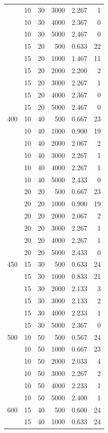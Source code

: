 \begin{longtable}{rrrrrr}
 & 10 & 30 & 3000 & 2.267 & 1 \\
 & 10 & 30 & 4000 & 2.367 & 0 \\
 & 10 & 30 & 5000 & 2.467 & 0 \\
 & 15 & 20 & 500 & 0.633 & 22 \\
 & 15 & 20 & 1000 & 1.467 & 11 \\
 & 15 & 20 & 2000 & 2.200 & 2 \\
 & 15 & 20 & 3000 & 2.267 & 1 \\
 & 15 & 20 & 4000 & 2.367 & 0 \\
 & 15 & 20 & 5000 & 2.467 & 0 \\
\midrule
400 & 10 & 40 & 500 & 0.667 & 23 \\
 & 10 & 40 & 1000 & 0.900 & 19 \\
 & 10 & 40 & 2000 & 2.067 & 2 \\
 & 10 & 40 & 3000 & 2.267 & 1 \\
 & 10 & 40 & 4000 & 2.267 & 1 \\
 & 10 & 40 & 5000 & 2.433 & 0 \\
 & 20 & 20 & 500 & 0.667 & 23 \\
 & 20 & 20 & 1000 & 0.900 & 19 \\
 & 20 & 20 & 2000 & 2.067 & 2 \\
 & 20 & 20 & 3000 & 2.267 & 1 \\
 & 20 & 20 & 4000 & 2.267 & 1 \\
 & 20 & 20 & 5000 & 2.433 & 0 \\
\midrule
450 & 15 & 30 & 500 & 0.633 & 24 \\
 & 15 & 30 & 1000 & 0.833 & 21 \\
 & 15 & 30 & 2000 & 2.133 & 3 \\
 & 15 & 30 & 3000 & 2.133 & 2 \\
 & 15 & 30 & 4000 & 2.233 & 1 \\
 & 15 & 30 & 5000 & 2.367 & 0 \\
\midrule
500 & 10 & 50 & 500 & 0.567 & 24 \\
 & 10 & 50 & 1000 & 0.667 & 23 \\
 & 10 & 50 & 2000 & 2.033 & 4 \\
 & 10 & 50 & 3000 & 2.267 & 2 \\
 & 10 & 50 & 4000 & 2.233 & 1 \\
 & 10 & 50 & 5000 & 2.400 & 1 \\
\midrule
600 & 15 & 40 & 500 & 0.600 & 24 \\
 & 15 & 40 & 1000 & 0.633 & 24 \\

\end{longtable}
